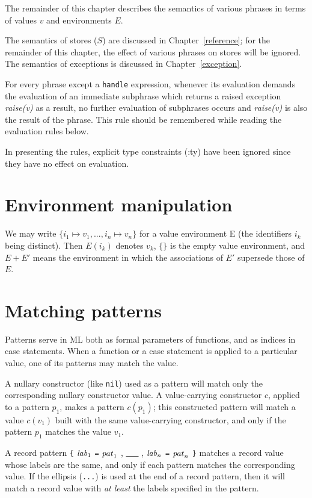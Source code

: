The remainder of this chapter describes the semantics of various
phrases in terms of values $v$ and environments $E$.

The semantics of stores ($S$) are discussed in
Chapter~\ref{reference};
for the remainder of this chapter, the
effect of various phrases on stores will be ignored.
The semantics of exceptions is discussed in
Chapter~\ref{exception}.


For every phrase except a \verb"handle" expression, whenever its
evaluation demands the evaluation of an immediate subphrase which
returns a raised exception {\em raise(v)} as a result, no further
evaluation of subphrases occurs and {\em raise(v)} is also the result
of the phrase.  This rule should be remembered while reading the
evaluation rules below.

In presenting the rules, explicit type
constraints (:ty) have been ignored since they have no effect on
evaluation.

\section{Environment manipulation}
We may write $\{ i_1 \mapsto v_1 , ... , i_n \mapsto v_n \}$ for a
value environment E (the identifiers $i_k$ being distinct).  Then
$E(i_k)$ denotes $v_k$, $\{\}$ is the empty value environment, and
$E+E'$ means the environment in which the associations of $E'$
supersede those of $E$.

\section{Matching patterns}
Patterns serve in ML both as formal parameters of functions, and
as indices in case statements.  When a function or a case statement
is applied to a particular value, one of its patterns may match the
value.

A nullary constructor (like \verb"nil") used as a pattern
will match only the corresponding nullary constructor value.  A
value-carrying constructor $c$, applied to a pattern $p_1$, makes a pattern
$c(p_1)$;
this constructed pattern will match a value $c(v_1)$
built with the same value-carrying constructor, and only if the
pattern $p_1$ matches the value $v_1$.

A record pattern 
\verb"{" ${\it lab}_1$ \verb"=" ${\it pat}_1$ , \underline{\ \ \ } , ${\it lab}_n$ \verb"=" ${\it pat}_n$ \verb"}"
matches a record value whose labels are the same, and only if each
pattern matches the corresponding value.
If the ellipsis (\verb"...") is used at the end of a record pattern,
then it will match a record value with {\it at least} the labels
specified in the pattern.

